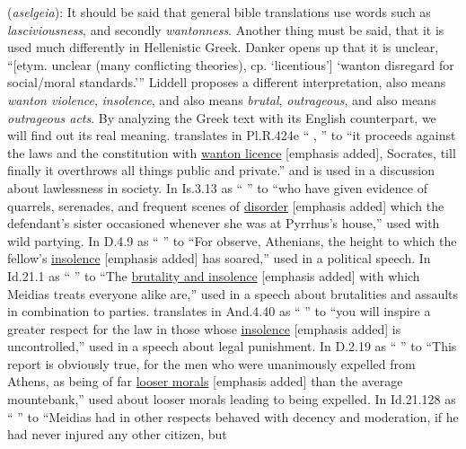 \item[Brutal (violence),]

(\textit{aselgeia}):
It should be said that general bible translations use words such as \emph{lasciviousness}, and secondly \emph{wantonness}. Another thing must be said, that it is used much differently in Hellenistic Greek. Danker opens up that it is unclear, ``[etym. unclear (many conflicting theories), cp.  `licentious'] `wanton disregard for social/moral standards.''' Liddell proposes a different interpretation,  also means \emph{wanton violence},  \emph{insolence}, and  also means \emph{brutal}, \emph{outrageous}, and  also means \emph{outrageous acts}. By analyzing the Greek text with its English counterpart, we will find out its real meaning.  translates in Pl.R.424e `` \underline{}, '' to ``it proceeds against the laws and the constitution with \underline{wanton licence} [emphasis added], Socrates, till finally it overthrows all things public and private.'' and is used in a discussion about lawlessness in society. In Is.3.13 as `` \underline{} '' to ``who have given evidence of quarrels, serenades, and frequent scenes of \underline{disorder} [emphasis added] which the defendant's sister occasioned whenever she was at Pyrrhus's house,'' used with wild partying. In D.4.9 as `` \underline{} '' to ``For observe, Athenians, the height to which the fellow's \underline{insolence} [emphasis added] has soared,'' used in a political speech. In Id.21.1 as `` \underline{}'' to ``The \underline{brutality and insolence} [emphasis added] with which Meidias treats everyone alike are,'' used in a speech about brutalities and assaults in combination to parties.  translates in And.4.40 as `` \underline{} '' to ``you will inspire a greater respect for the law in those whose \underline{insolence} [emphasis added] is uncontrolled,'' used in a speech about legal punishment. In D.2.19 as `` \underline{} '' to ``This report is obviously true, for the men who were unanimously expelled from Athens, as being of far \underline{looser morals} [emphasis added] than the average mountebank,'' used about looser morals leading to being expelled. In Id.21.128 as `` \underline{} '' to ``Meidias had in other respects behaved with decency and moderation, if he had never injured any other citizen, but 